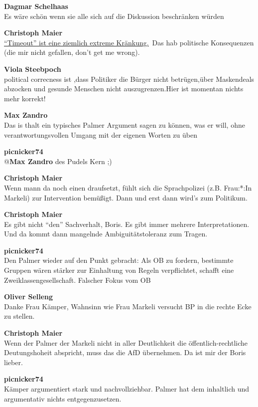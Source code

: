\documentclass[]{article}
\begin{document}
\textbf{Dagmar Schelhaas}\\
Es wäre schön wenn sie alle sich auf die Diskussion beschränken würden

\textbf{Christoph Maier}\\
\hyperref[timeout]{``Timeout'' ist eine ziemlich extreme
Kränkung.}\
Das hab politische Konsequenzen (die mir nicht gefallen,
don't get me wrong).

\textbf{Viola Steebpoch}\\
political correcness ist ,dass Politiker die Bürger nicht betrügen,über
Maskendeals abzocken und gesunde Menschen nicht auszugrenzen.Hier ist
momentan nichts mehr korrekt!

\textbf{Max Zandro}\\
Das is thalt ein typisches Palmer Argument sagen zu können, was er
will, ohne verantwortungsvollen Umgang mit der eigenen Worten zu üben

\textbf{picnicker74}\\
@\textbf{Max Zandro} des Pudels Kern ;)

\textbf{Christoph Maier}\\
Wenn mann da noch einen draufsetzt, fühlt sich die Sprachpolizei (z.B.
Frau:*:In Markeli) zur Intervention bemüßigt. Dann und erst dann wird's
zum Politikum.

\textbf{Christoph Maier}\\
Es gibt nicht ``den'' Sachverhalt, Boris.
Es gibt immer mehrere
Interpretationen.\cite{calliope}
Und da kommt dann mangelnde
Ambiguitätstoleranz\cite{ambiguitaetstoleranz} zum
Tragen.

\textbf{picnicker74}\\
Den Palmer wieder auf den Punkt gebracht: Als OB zu fordern, bestimmte
Gruppen wären stärker zur Einhaltung von Regeln verpflichtet, schafft
eine Zweiklassengesellschaft. Falscher Fokus vom OB

\textbf{Oliver Selleng}\\
Danke Frau Kämper, Wahnsinn wie Frau Markeli versucht BP in die rechte
Ecke zu stellen.

\textbf{Christoph Maier}\\
Wenn der Palmer der Markeli nicht in aller Deutlichkeit die
öffentlich-rechtliche Deutungshoheit\cite{deutungshoheit}
abspricht, muss das die AfD übernehmen. Da ist mir der Boris lieber.

\textbf{picnicker74}\\
Kämper argumentiert stark und nachvollziehbar. Palmer hat dem
inhaltlich und argumentativ nichts entgegenzusetzen.
\end{document}
